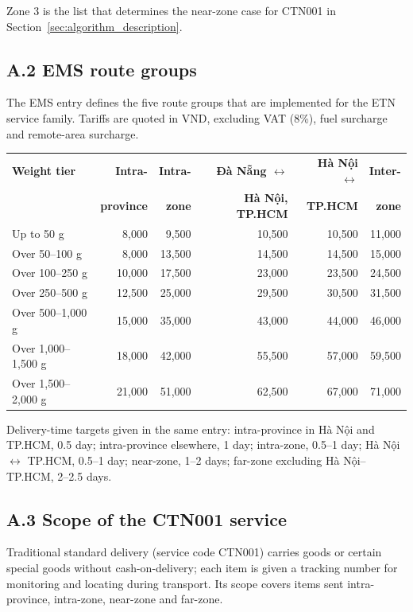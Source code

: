 \noindent Zone 3 is the list that determines the near-zone case for CTN001 in Section~\ref{sec:algorithm_description}.

\subsection*{A.2 EMS route groups}

\noindent The EMS entry defines the five route groups that are implemented for the ETN service family. Tariffs are quoted in VND, excluding VAT (8\%), fuel surcharge and remote-area surcharge.

\begin{table}[H]
\centering
\small
\setlength{\tabcolsep}{4pt}
\begin{tabular}{lrrrrr}
\hline
\textbf{Weight tier} & \textbf{Intra-} & \textbf{Intra-} & \textbf{Đà Nẵng $\leftrightarrow$} & \textbf{Hà Nội $\leftrightarrow$} & \textbf{Inter-} \\
 & \textbf{province} & \textbf{zone} & \textbf{Hà Nội, TP.HCM} & \textbf{TP.HCM} & \textbf{zone} \\
\hline
Up to 50 g & 8,000 & 9,500 & 10,500 & 10,500 & 11,000 \\
Over 50--100 g & 8,000 & 13,500 & 14,500 & 14,500 & 15,000 \\
Over 100--250 g & 10,000 & 17,500 & 23,000 & 23,500 & 24,500 \\
Over 250--500 g & 12,500 & 25,000 & 29,500 & 30,500 & 31,500 \\
Over 500--1,000 g & 15,000 & 35,000 & 43,000 & 44,000 & 46,000 \\
Over 1,000--1,500 g & 18,000 & 42,000 & 55,500 & 57,000 & 59,500 \\
Over 1,500--2,000 g & 21,000 & 51,000 & 62,500 & 67,000 & 71,000 \\
\hline
\end{tabular}
\end{table}

\noindent Delivery-time targets given in the same entry: intra-province in Hà Nội and TP.HCM, 0.5 day; intra-province elsewhere, 1 day; intra-zone, 0.5--1 day; Hà Nội $\leftrightarrow$ TP.HCM, 0.5--1 day; near-zone, 1--2 days; far-zone excluding Hà Nội--TP.HCM, 2--2.5 days.

\subsection*{A.3 Scope of the CTN001 service}

\noindent Traditional standard delivery (service code CTN001) carries goods or certain special goods without cash-on-delivery; each item is given a tracking number for monitoring and locating during transport. Its scope covers items sent intra-province, intra-zone, near-zone and far-zone.

